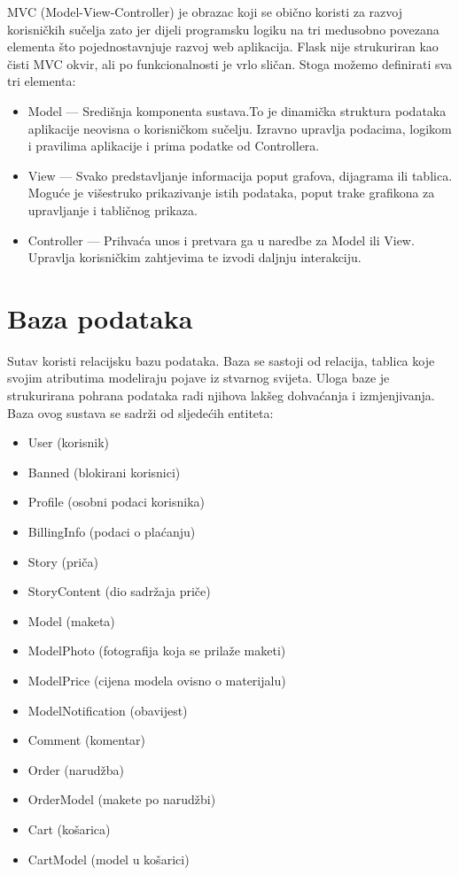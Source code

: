 		MVC (Model-View-Controller) je obrazac koji se obično koristi za razvoj korisničkih sučelja zato jer dijeli programsku	logiku na tri medusobno povezana elementa što pojednostavnjuje razvoj web	aplikacija. Flask nije strukuriran kao čisti MVC okvir, ali po funkcionalnosti je vrlo sličan. Stoga možemo definirati sva tri elementa: 
		\begin{itemize}
			\item Model --- Središnja komponenta sustava.To je dinamička struktura podataka aplikacije neovisna o korisničkom sučelju. Izravno upravlja podacima, logikom i pravilima aplikacije i prima podatke od Controllera.
			\item View --- Svako predstavljanje informacija poput grafova, dijagrama ili tablica. Moguće je višestruko prikazivanje istih podataka, poput trake grafikona za upravljanje i tabličnog prikaza.
			\item Controller --- Prihvaća unos i pretvara ga u naredbe za Model ili View. Upravlja	korisničkim zahtjevima te izvodi daljnju interakciju.
		\end{itemize}
				
		\section{Baza podataka}
			
			\noindent Sutav koristi relacijsku bazu podataka. Baza se sastoji od relacija, tablica koje svojim atributima modeliraju pojave iz stvarnog svijeta. Uloga baze je strukurirana pohrana  podataka radi njihova lakšeg dohvaćanja i izmjenjivanja. Baza ovog sustava se sadrži od sljedećih entiteta:
			\begin{itemize}
				\item User (korisnik)
				\item Banned (blokirani korisnici)
				\item Profile (osobni podaci korisnika)
				\item BillingInfo (podaci o plaćanju)
				\item Story (priča)
				\item StoryContent (dio sadržaja priče) 
				\item Model (maketa)
				\item ModelPhoto (fotografija koja se prilaže maketi)
				\item ModelPrice (cijena modela ovisno o materijalu)
				\item ModelNotification (obavijest)
				\item Comment (komentar)
				\item Order (narudžba)
				\item OrderModel (makete po narudžbi)
				\item Cart (košarica)
				\item CartModel (model u košarici)
			\end{itemize}
		
